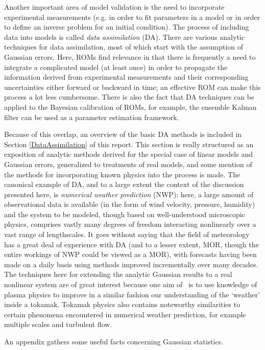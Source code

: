 Another important area of model validation is the need to incorporate experimental measurements (e.g. in order to fit parameters in a model or in order to define an inverse problem for an initial condition).  
The process of including data into models is called {\it data assimilation} (DA).  
There are various analytic techniques for data assimilation, most of which start with the assumption of Gaussian errors.  
Here, ROMs find relevance in that there is frequently a need to integrate a complicated model (at least once) in order to propagate the information derived from experimental measurements and their corresponding uncertainties either forward or backward in time; an effective ROM can make this process a lot less cumbersome.  There is also the fact that DA techniques can be applied to the Bayesian calibration of ROMs, for example, the ensemble Kalman filter can be used as a parameter estimation framework.

Because of this overlap, an overview of the basic DA methods is included in Section \ref{DataAssimilation} of this report.  
This section is really structured as an exposition of analytic methods derived for the special case of linear models and Gaussian errors, generalized to treatments of real models, and some mention of the methods for incorporating known physics into the process is made.  
The canonical example of DA, and to a large extent the context of the discussion presented here, is {\it numerical weather prediction} (NWP); here, a large amount of observational data is available (in the form of wind velocity, pressure, humidity) and the system to be modeled, though based on well-understood microscopic physics, comprises vastly many degrees of freedom interacting nonlinearly over a vast range of lengthscales.  
It goes without saying that the field of meteorology has a great deal of experience with DA (and to a lesser extent, MOR, though the entire workings of NWP could be viewed as a MOR), with forecasts having been made on a daily basis using methods improved incrementally over many decades.  
The techniques here for extending the analytic Gaussian results to a real nonlinear system are of great interest because one aim of \nep\ is to use knowledge of plasma physics to improve in a similar fashion our understanding of the `weather' inside a tokamak.  
Tokamak physics also contains noteworthy similarities to certain phenomena encountered in numerical weather prediction, for example multiple scales and turbulent flow.

An appendix gathers some useful facts concerning Gaussian statistics.

